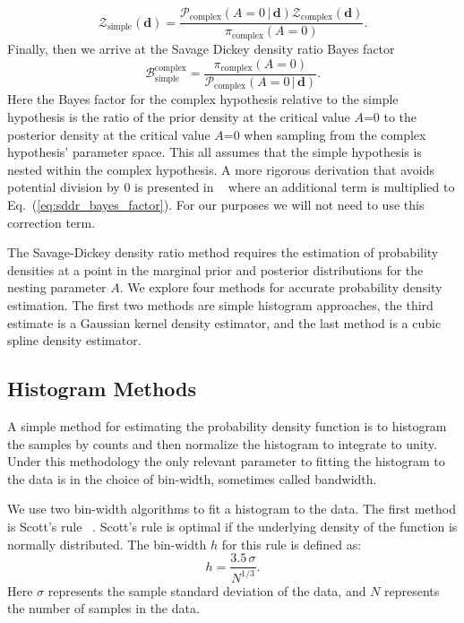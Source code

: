 \begin{equation}
    \mathcal{Z}_{\mathrm{simple}}\left(\mathbf{d}\right) = \frac{\mathcal{P}_{\mathrm{complex}}\left(A=0 \, | \, \mathbf{d}\right) \mathcal{Z}_{\mathrm{complex}} \left(\mathbf{d} \right)} {\pi_{\mathrm{complex}} \left(A=0\right)}.
\end{equation}
Finally, then we arrive at the Savage Dickey density ratio Bayes factor
\begin{equation}\label{sddr_bayes_factor}
    \mathcal{B}^{\mathrm{complex}}_{\mathrm{simple}} = \frac{\pi_{\mathrm{complex}}\left(A=0\right)}{\mathcal{P}_{\mathrm{complex}}\left(A=0 \, | \, \mathbf{d}\right)}.
\end{equation}
Here the Bayes factor for the complex hypothesis relative to the simple hypothesis is the ratio of the prior density at the critical value $A$=$0$ to the posterior density at the critical value $A$=$0$ when sampling from the complex hypothesis' parameter space. This all assumes that the simple hypothesis is nested within the complex hypothesis. A more rigorous derivation that avoids potential division by $0$ is presented in ~\cite{verdinelli1995computing} where an additional term is multiplied to Eq.~(\ref{eq:sddr_bayes_factor}). For our purposes we will not need to use this correction term.

The Savage-Dickey density ratio method requires the estimation of probability densities at a point in the marginal prior and posterior distributions for the nesting parameter $A$. We explore four methods for accurate probability density estimation. The first two methods are simple histogram approaches, the third estimate is a Gaussian kernel density estimator, and the last method is a cubic spline density estimator.

\subsection{Histogram Methods}
A simple method for estimating the probability density function is to histogram the samples by counts and then normalize the histogram to integrate to unity. Under this methodology the only relevant parameter to fitting the histogram to the data is in the choice of bin-width, sometimes called bandwidth.

We use two bin-width algorithms to fit a histogram to the data. The first method is Scott's rule~\citep{scott1979optimal} . Scott's rule is optimal if the underlying density of the function is normally distributed. The bin-width $h$ for this rule is defined as:
\begin{equation}
    h = \frac{3.5 \, \sigma}{N^{1/3}}.
\end{equation}
Here $\sigma$ represents the sample standard deviation of the data, and $N$ represents the number of samples in the data.

